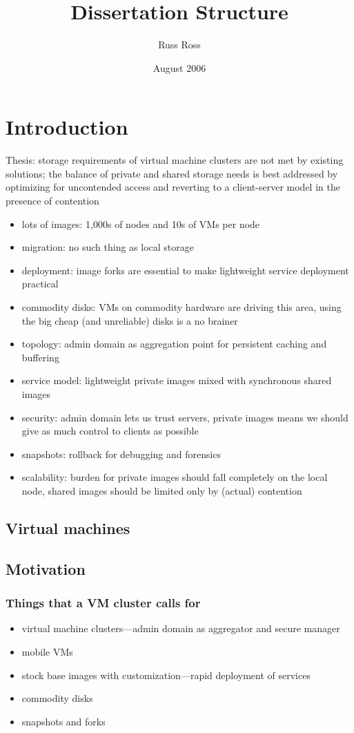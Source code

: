 \documentclass[a4paper]{article}
\title{Dissertation Structure}
\author{Russ Ross}
\date{August 2006}
\begin{document}
\maketitle

\section{Introduction}
Thesis: storage requirements of virtual machine clusters are not met by existing solutions; the balance of private and shared storage needs is best addressed by optimizing for uncontended access and reverting to a client-server model in the presence of contention
\begin{itemize}
\item lots of images: 1,000s of nodes and 10s of VMs per node
\item migration: no such thing as local storage
\item deployment: image forks are essential to make lightweight service deployment practical
\item commodity disks: VMs on commodity hardware are driving this area, using the big cheap (and unreliable) disks is a no brainer
\item topology: admin domain as aggregation point for persistent caching and buffering
\item service model: lightweight private images mixed with synchronous shared images
\item security: admin domain lets us trust servers, private images means we should give as much control to clients as possible
\item snapshots: rollback for debugging and forensics
\item scalability: burden for private images should fall completely on the local node, shared images should be limited only by (actual) contention
\end{itemize}

\subsection{Virtual machines}
\subsection{Motivation}
\subsubsection{Things that a VM cluster calls for}
\begin{itemize}
\item virtual machine clusters---admin domain as aggregator and secure manager
\item mobile VMs
\item stock base images with customization---rapid deployment of services
\item commodity disks
\item snapshots and forks
\end{itemize}
\end{document}
